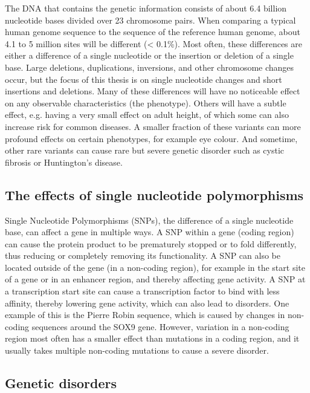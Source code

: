 The DNA that contains the genetic information consists of about 6.4 billion nucleotide bases divided over 23 chromosome pairs. When comparing a typical human genome sequence to the sequence of the reference human genome, about 4.1 to 5 million sites will be different (< 0.1\%). Most often, these differences are either a difference of a single nucleotide or the insertion or deletion of a single base\cite{the1000genomesprojectconsortiumGlobalReferenceHuman2015}. Large deletions, duplications, inversions, and other chromosome changes occur, but the focus of this thesis is on single nucleotide changes and short insertions and deletions. Many of these differences will have no noticeable effect on any observable characteristics (the phenotype). Others will have a subtle effect, e.g. having a very small effect on adult height, of which some can also increase risk for common diseases. A smaller fraction of these variants can more profound effects on certain phenotypes, for example eye colour. And sometime, other rare variants can cause rare but severe genetic disorder such as cystic fibrosis or Huntington’s disease. 


\subsection{The effects of single nucleotide polymorphisms}

Single Nucleotide Polymorphisms (SNPs), the difference of a single nucleotide base, can affect a gene in multiple ways. A SNP within a gene (coding region) can cause the protein product to be prematurely stopped\cite{deboeverMedicalRelevanceProteintruncating2018} or to fold differently\cite{vihinenTypesEffectsProtein2015}, thus reducing or completely removing its functionality. A SNP can also be located outside of the gene (in a non-coding region), for example in the start site of a gene or in an enhancer region, and thereby affecting gene activity. A SNP at a transcription start site can cause a transcription factor to bind with less affinity, thereby lowering gene activity, which can also lead to disorders. One example of this is the Pierre Robin sequence, which is caused by changes in non-coding sequences around the SOX9 gene\cite{benkoHighlyConservedNoncoding2009}. However, variation in a non-coding region most often has a smaller effect than mutations in a coding region, and it usually takes multiple non-coding mutations to cause a severe disorder.


\subsection{Genetic disorders}

